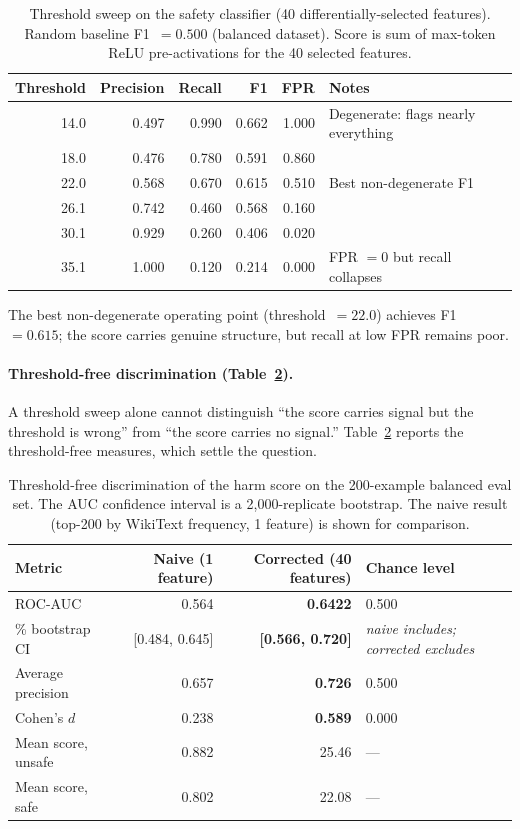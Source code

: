 \documentclass[11pt]{article}
\begin{document}
\begin{table}[h]
\centering
\caption{Threshold sweep on the safety classifier (40 differentially-selected features). Random baseline F1~$= 0.500$ (balanced dataset). Score is sum of max-token ReLU pre-activations for the 40 selected features.}
\label{tab:classifier}
\begin{tabular}{@{}rrrrrl@{}}
\toprule
Threshold & Precision & Recall & F1 & FPR & Notes \\
\midrule
14.0 & 0.497 & 0.990 & 0.662 & 1.000 & Degenerate: flags nearly everything \\
18.0 & 0.476 & 0.780 & 0.591 & 0.860 & \\
22.0 & 0.568 & 0.670 & 0.615 & 0.510 & Best non-degenerate F1 \\
26.1 & 0.742 & 0.460 & 0.568 & 0.160 & \\
30.1 & 0.929 & 0.260 & 0.406 & 0.020 & \\
35.1 & 1.000 & 0.120 & 0.214 & 0.000 & FPR $= 0$ but recall collapses \\
\bottomrule
\end{tabular}
\end{table}

The best non-degenerate operating point (threshold~$= 22.0$) achieves F1~$= 0.615$; the score carries genuine structure, but recall at low FPR remains poor.

\paragraph{Threshold-free discrimination (Table~\ref{tab:auc}).} A threshold sweep alone cannot distinguish ``the score carries signal but the threshold is wrong'' from ``the score carries no signal.'' Table~\ref{tab:auc} reports the threshold-free measures, which settle the question.

\begin{table}[h]
\centering
\caption{Threshold-free discrimination of the harm score on the 200-example balanced eval set. The AUC confidence interval is a 2,000-replicate bootstrap. The naive result (top-200 by WikiText frequency, 1 feature) is shown for comparison.}
\label{tab:auc}
  \footnotesize\setlength{\tabcolsep}{4pt}
\begin{tabular}{@{}lrrl@{}}
\toprule
Metric & Naive (1 feature) & Corrected (40 features) & Chance level \\
\midrule
ROC-AUC                 & 0.564 & \textbf{0.6422} & 0.500 \\
\quad 95\% bootstrap CI & [0.484, 0.645] & \textbf{[0.566, 0.720]} & \emph{naive includes; corrected excludes} \\
Average precision       & 0.657 & \textbf{0.726} & 0.500 \\
Cohen's $d$             & 0.238 & \textbf{0.589} & 0.000 \\
Mean score, unsafe      & 0.882 & 25.46 & --- \\
Mean score, safe        & 0.802 & 22.08 & --- \\
\bottomrule
\end{tabular}
\end{table}
\end{document}

